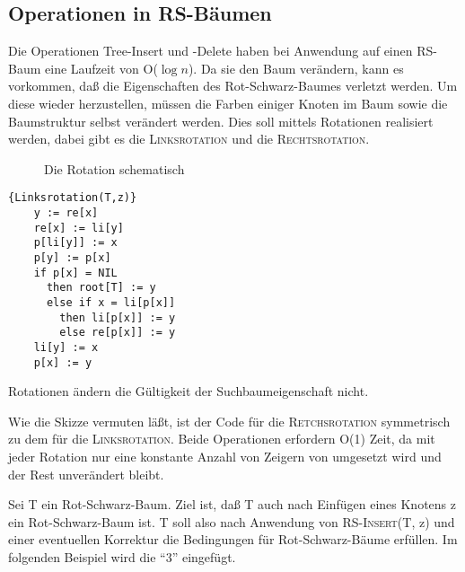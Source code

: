 \subsection{Operationen in RS-Bäumen}

Die Operationen Tree-Insert und -Delete haben bei Anwendung auf einen RS-Baum eine Laufzeit von O($\log n$). Da
sie den Baum verändern, kann es vorkommen, daß die Eigenschaften des Rot-Schwarz-Baumes verletzt werden. Um diese wieder herzustellen,
müssen die
Farben einiger Knoten im Baum sowie die Baumstruktur selbst verändert werden. Dies soll mittels Rotationen realisiert werden, dabei
gibt es die \textsc{Linksrotation} und die \textsc{Rechtsrotation}.

\centering
\begin{figure}[H]

\caption{Die Rotation schematisch}
\end{figure}


\begin{Algorithmus}[H]
\begin{lstlisting}[frame=tlrb, mathescape=true, title=\textsc{Linksrotation\textnormal{(T, z)}}, gobble=4]{Linksrotation(T,z)}
    y := re[x]
    re[x] := li[y]
    p[li[y]] := x
    p[y] := p[x]
    if p[x] = NIL
      then root[T] := y
      else if x = li[p[x]]
        then li[p[x]] := y
        else re[p[x]] := y
    li[y] := x
    p[x] := y
\end{lstlisting}
\end{Algorithmus}

\begin{satz}
Rotationen ändern die Gültigkeit der Suchbaumeigenschaft nicht.
\end{satz}

Wie die Skizze vermuten läßt, ist der Code für die \textsc{Retchsrotation} symmetrisch zu dem für die \textsc{Linksrotation}. Beide
Operationen erfordern O(1) Zeit, da mit jeder Rotation nur eine konstante Anzahl von Zeigern von umgesetzt wird und der Rest
unverändert bleibt.

Sei T ein Rot-Schwarz-Baum. Ziel ist, daß T auch nach Einfügen eines Knotens z ein Rot-Schwarz-Baum ist. T soll also 
nach Anwendung von \textsc{RS-Insert}(T, z) und einer eventuellen Korrektur die Bedingungen für Rot-Schwarz-Bäume erfüllen. Im folgenden Beispiel wird die "`3"'
eingefügt.

